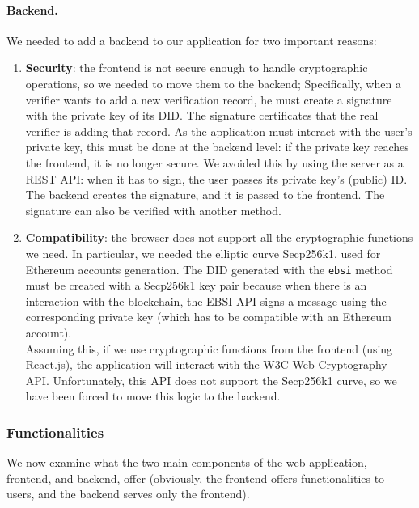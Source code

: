 \paragraph{Backend.}
We needed to add a backend to our application for two important reasons:
\begin{enumerate}
    \item \textbf{Security}: the frontend is not secure enough to handle cryptographic
    operations, so we needed to move them to the backend; Specifically, when a 
    verifier wants to add a new verification record, he must create a signature with 
    the private key of its DID. The signature certificates that the real verifier is
    adding that record. As the application must interact with the user's private key, 
    this must be done at the backend level: if the private key reaches the frontend, 
    it is no longer secure. We avoided this by using the server as a REST API: when 
    it has to sign, the user passes its private key's (public) ID. The backend creates
    the signature, and it is passed to the frontend. The signature can also be 
    verified with another method.
    \item \textbf{Compatibility}: the browser does not support all the cryptographic
    functions we need. In particular, we needed the elliptic curve Secp256k1, used 
    for Ethereum accounts generation. The DID generated with the \texttt{ebsi} method must be 
    created with a Secp256k1 key pair because when there is an interaction with the 
    blockchain, the EBSI API signs a message using the corresponding private key
    (which has to be compatible with an Ethereum account).\\
    Assuming this, if we use cryptographic functions from the frontend (using 
    React.js), the application will interact with the W3C Web Cryptography API\cite{site:w3ccrypto}. 
    Unfortunately, this API does not support the Secp256k1 curve, so we have been 
    forced to move this logic to the backend. 
\end{enumerate}

\subsubsection{Functionalities}
We now examine what the two main components of the web application, frontend, and 
backend, offer (obviously, the frontend offers functionalities to users, and the 
backend serves only the frontend).
